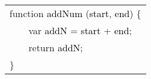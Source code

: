 \scriptsize\begin{tabular}[t]{>{\ttfamily}l}
\textcolor{myrose}{function} \textcolor{black}{addNum} (\textcolor{black}{start}, \textcolor{black}{end}) \{ \\
\ \ \ \ \textcolor{myrose}{var} \textcolor{black}{addN} = \textcolor{black}{start} + \textcolor{black}{end};\\
\ \ \ \ \textcolor{myrose}{return} \textcolor{black}{addN};\\
\}
\end{tabular}
